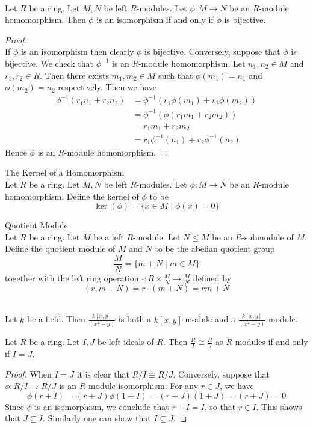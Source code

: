 \documentclass[a4paper]{article}
\begin{document}
\begin{lmm}{}{}\\
Let $R$ be a ring. Let $M,N$ be left $R$-modules. Let $\phi:M\to N$ be an $R$-module homomorphism. Then $\phi$ is an isomorphism if and only if $\phi$ is bijective. 
\begin{proof}\\
If $\phi$ is an isomorphism then clearly $\phi$ is bijective. Conversely, suppose that $\phi$ is bijective. We check that $\phi^{-1}$ is an $R$-module homomorphism. Let $n_1,n_2\in M$ and $r_1,r_2\in R$. Then there exists $m_1,m_2\in M$ such that $\phi(m_1)=n_1$ and $\phi(m_2)=n_2$ respectively. Then we have 
\begin{align*}
\phi^{-1}(r_1n_1+r_2n_2)&=\phi^{-1}(r_1\phi(m_1)+r_2\phi(m_2))\\
&=\phi^{-1}(\phi(r_1m_1+r_2m_2))\\
&=r_1m_1+r_2m_2\\
&=r_1\phi^{-1}(n_1)+r_2\phi^{-1}(n_2)
\end{align*}
Hence $\phi$ is an $R$-module homomorphism. 
\end{proof}
\end{lmm}

\begin{defn}{The Kernel of a Homomorphism}{}\\
Let $R$ be a ring. Let $M,N$ be left $R$-modules. Let $\phi:M\to N$ be an $R$-module homomorphism. Define the kernel of $\phi$ to be $$\ker(\phi)=\{x\in M\;|\;\phi(x)=0\}$$
\end{defn}

\begin{defn}{Quotient Module}{}\\
Let $R$ be a ring. Let $M$ be a left $R$-module. Let $N\leq M$ be an $R$-submodule of $M$. Define the quotient module of $M$ and $N$ to be the abelian quotient group $$\frac{M}{N}=\{m+N\;|\;m\in M\}$$ together with the left ring operation $\cdot:R\times\frac{M}{N}\to\frac{M}{N}$ defined by $$(r,m+N)=r\cdot(m+N)=rm+N$$
\end{defn}

\begin{eg}{}{}\\
Let $k$ be a field. Then $\frac{k[x,y]}{(x^2-y)}$ is both a $k[x,y]$-module and a $\frac{k[x,y]}{(x^2-y)}$-module. 
\end{eg}

\begin{lmm}{}{} Let $R$ be a ring. Let $I,J$ be left ideals of $R$. Then $\frac{R}{I}\cong\frac{R}{J}$ as $R$-modules if and only if $I=J$. 
\begin{proof}
When $I=J$ it is clear that $R/I\cong R/J$. Conversely, suppose that $\phi:R/I\to R/J$ is an $R$-module isomorphism. For any $r\in J$, we have $$\phi(r+I)=(r+J)\phi(1+I)=(r+J)(1+J)=(r+J)=0$$ Since $\phi$ is an isomorphism, we conclude that $r+I=I$, so that $r\in I$. This shows that $J\subseteq I$. Similarly one can show that $I\subseteq J$. 
\end{proof}
\end{lmm}
\end{document}
